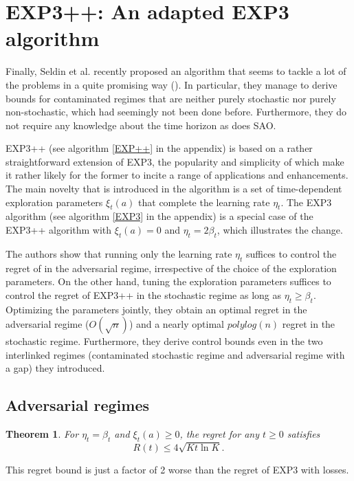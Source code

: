 \documentclass[10.5pt]{article}
\newtheorem{theorem}{Theorem}
\begin{document}
\section*{EXP3++: An adapted EXP3 algorithm}

Finally, Seldin et al. recently proposed an algorithm that seems to tackle a lot of the problems in a quite promising way (\cite{Seld14}). In particular, they manage to derive bounds for contaminated regimes that are neither purely stochastic nor purely non-stochastic, which had seemingly not been done before. Furthermore, they do not require any knowledge about the time horizon as does SAO.

EXP3++ (see algorithm \ref{EXP++} in the appendix) is based on a rather straightforward extension of EXP3, the popularity and simplicity of which make it rather likely for the former to incite a range of applications and enhancements. The main novelty that is introduced in the algorithm is a set of time-dependent exploration parameters $\xi_t(a)$ that complete the learning rate $\eta_t$. The EXP3 algorithm (see algorithm \ref{EXP3} in the appendix) is a special case of the EXP3++ algorithm with $\xi_t(a) = 0$ and $\eta_t = 2 \beta_t$, which illustrates the change.

The authors show that running only the learning rate $\eta_t$ suffices to control the regret of  in the adversarial regime, irrespective of the choice of the exploration parameters. On the other hand, tuning the exploration parameters suffices to control the regret of EXP3++ in the stochastic regime as long as $\eta_t \geq \beta_t$. Optimizing the parameters jointly, they obtain an optimal regret in the adversarial regime ($O(\sqrt{n})$) and a nearly optimal $polylog(n)$ regret in the stochastic regime. Furthermore, they derive control bounds even in the two interlinked regimes (contaminated stochastic regime and adversarial regime with a gap) they introduced.

\subsection*{Adversarial regimes}

\begin{theorem}
For $\eta_{t}=\beta_{t}$ and $\xi_t(a) \geq 0$, the regret for any $t\geq0$ satisfies 
$$R(t) \leq 4\sqrt{K t\ln K}.$$ 
\end{theorem}
This regret bound is just a factor of 2 worse than the regret of EXP3 with losses.
\end{document}
